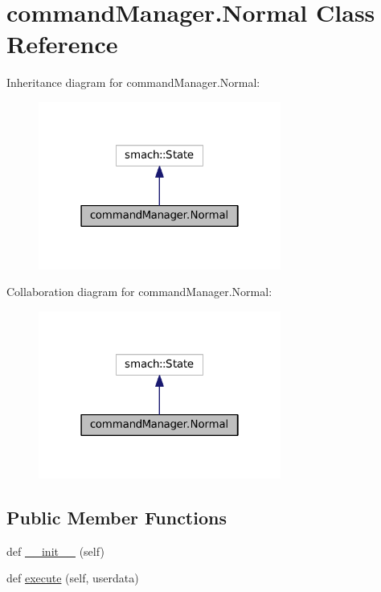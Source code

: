 \hypertarget{classcommandManager_1_1Normal}{}\section{command\+Manager.\+Normal Class Reference}
\label{classcommandManager_1_1Normal}


Inheritance diagram for command\+Manager.\+Normal\+:\nopagebreak
\begin{figure}[H]
\begin{center}
\leavevmode
\includegraphics[width=226pt]{classcommandManager_1_1Normal__inherit__graph}
\end{center}
\end{figure}


Collaboration diagram for command\+Manager.\+Normal\+:\nopagebreak
\begin{figure}[H]
\begin{center}
\leavevmode
\includegraphics[width=226pt]{classcommandManager_1_1Normal__coll__graph}
\end{center}
\end{figure}
\subsection*{Public Member Functions}
\begin{DoxyCompactItemize}
\item 
def \hyperlink{classcommandManager_1_1Normal_abda69ab53b7d84c2c0c577dcf26f3823}{\+\_\+\+\_\+init\+\_\+\+\_\+} (self)
\item 
def \hyperlink{classcommandManager_1_1Normal_ae95451bab37e817557988c7190bb33bd}{execute} (self, userdata)
\end{DoxyCompactItemize}
